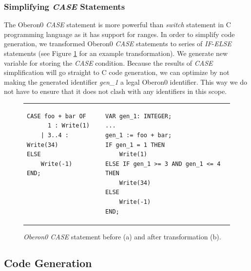 \subsubsection{\label{sub:Simplifying-CASE-Statements}Simplifying \emph{CASE} Statements}

The Oberon0 \emph{CASE} statement is more powerful than \emph{switch}
statement in C programming language as it has support for ranges.
In order to simplify code generation, we transformed Oberon0 \emph{CASE}
statements to series of \emph{IF}-\emph{ELSE }statements (see Figure
\ref{fig:CASE-statement} for an example transformation). We generate
new variable for storing the \emph{CASE} condition. Because the results
of \emph{CASE} simplification will go straight to C code generation,
we can optimize by not making the generated identifier \emph{gen\_1}
a legal Oberon0 identifier. This way we do not have to ensure that
it does not clash with any identifiers in this scope.

%
\begin{figure}[!h]
\begin{tabular}{>{\centering}p{}>{\centering}p{}}
{\footnotesize }
\begin{lstlisting}[basicstyle={\footnotesize\ttfamily},showlines=true]
CASE foo + bar OF
      1 : Write(1)
    | 3..4 : Write(34)
ELSE
    Write(-1)
END;
 
 
  
 
\end{lstlisting}
{\footnotesize \par}

\subfloat[\label{fig:case-before}]{} & {\footnotesize }
\begin{lstlisting}[basicstyle={\footnotesize\ttfamily}]
VAR gen_1: INTEGER;
...
gen_1 := foo + bar;
IF gen_1 = 1 THEN
    Write(1)
ELSE IF gen_1 >= 3 AND gen_1 <= 4 THEN
    Write(34)
ELSE
    Write(-1)
END;
\end{lstlisting}
{\footnotesize \par}

\subfloat[\label{fig:case-after}]{}\tabularnewline
\end{tabular}

\caption{\emph{\label{fig:CASE-statement}Oberon0 CASE} statement before (a)
and after transformation (b).}

\end{figure}



\subsection{Code Generation}

